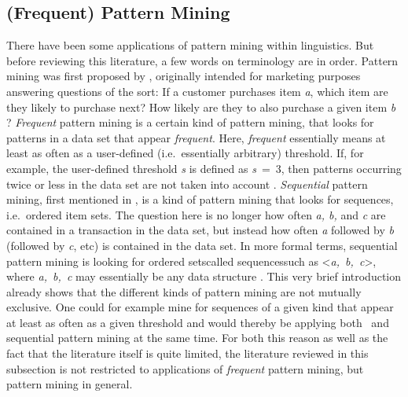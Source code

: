 \subsection{(Frequent) Pattern Mining}
\label{ssec:introresfpm}
There have been some applications of pattern mining within linguistics.
But before reviewing this literature, a few words on terminology are in order.
Pattern mining was first proposed by \citet{agrawal_mining_1993}, originally intended for marketing purposes answering questions of the sort:
If a customer purchases item \emph{a}, which item are they likely to purchase next?
How likely are they to also purchase a given item \emph{b} \citep[]{han_frequent_2007}?
\emph{Frequent} pattern mining is a certain kind of pattern mining, that looks for patterns in a data set that appear \emph{frequent}.
Here, \emph{frequent} essentially means at least as often as a user-defined (i.e.~essentially arbitrary) threshold.
If, for example, the user-defined threshold \emph{s} is defined as \emph{s}~=~3, then patterns occurring twice or less in the data set are not taken into account \citep[]{han_data_2012}.
\emph{Sequential} pattern mining, first mentioned in \citet{agrawal_mining_1995}, is a kind of pattern mining that looks for sequences, i.e.~ordered item sets.
The question here is no longer how often \emph{a, b,} and \emph{c} are contained in a transaction in the data set, but instead how often \emph{a} followed by \emph{b} (followed by \emph{c}, etc) is contained in the data set.
In more formal terms, sequential pattern mining is looking for ordered sets\dash called sequences\dash such as <\emph{a,~b,~c}>, where \emph{a,~b,~c} may essentially be any data structure \citep[]{han_frequent_2007}.
This very brief introduction already shows that the different kinds of pattern mining are not mutually exclusive.
One could for example mine for sequences of a given kind that appear at least as often as a given threshold and would thereby be applying both \fpmlower\ and sequential pattern mining at the same time.
For both this reason as well as the fact that the literature itself is quite limited, the literature reviewed in this subsection is not restricted to applications of \emph{frequent} pattern mining, but pattern mining in general.


